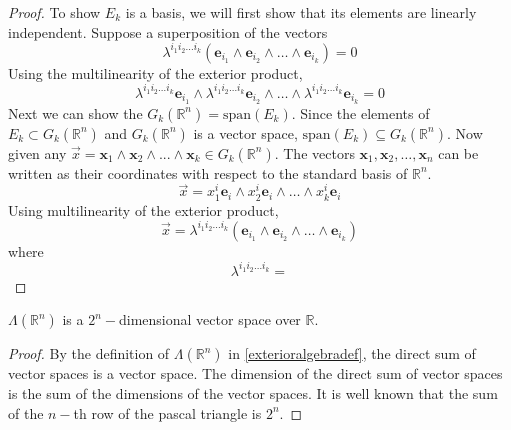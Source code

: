 \documentclass{article}
\numberwithin{equation}{section}
\newcommand{\R}{\mathbb{R}}
\newcommand{\ve}{\mathbf}
\begin{document}
\begin{proposition}
\begin{proof}
        To show $E_k$ is a basis, we will first show that its elements are linearly independent. Suppose a superposition of the vectors
        \begin{equation}
            \lambda^{i_1i_2\dots i_k}(\ve e_{i_1}\wedge\ve e_{i_2}\wedge\dots\wedge\ve e_{i_k})=0
        \end{equation}
        Using the multilinearity of the exterior product, 
        \begin{equation}
            \lambda^{i_1i_2\dots i_k}\ve e_{i_1}\wedge\lambda^{i_1i_2\dots i_k}\ve e_{i_2}\wedge\dots\wedge\lambda^{i_1i_2\dots i_k}\ve e_{i_k}=0
        \end{equation}
        Next we can show the $G_k(\R^n)=\text{span}(E_k)$. Since the elements of $E_k\subset G_k(\R^n)$ and $G_k(\R^n)$ is a vector space, $\text{span}(E_k)\subseteq G_k(\R^n)$. Now given any $\vec x=\ve x_1\wedge\ve x_2\wedge...\wedge\ve x_k\in G_k(\R^n)$. The vectors $\ve x_1,\ve x_2,\dots,\ve x_n$ can be written as their coordinates with respect to the standard basis of $\R^n$.
        \begin{equation}
            \vec x=x_1^i\ve e_i\wedge x_2^i\ve e_i\wedge\dots\wedge x_k^i\ve e_i
        \end{equation}
        Using multilinearity of the exterior product, 
        \begin{equation}
            \vec x=\lambda^{i_1i_2\dots i_k}(\ve e_{i_1}\wedge\ve e_{i_2}\wedge\dots\wedge\ve e_{i_k})
        \end{equation}
        where 
        \begin{equation}
            \lambda^{i_1i_2\dots i_k}= %
        \end{equation}
    \end{proof}
    \begin{corollary}
        $\Lambda(\R^n)$ is a $2^n-$dimensional vector space over $\R$.
        \begin{proof}
            By the definition of $\Lambda(\R^n)$ in \eqref{exterioralgebradef}, the direct sum of vector spaces is a vector space. The dimension of the direct sum of vector spaces is the sum of the dimensions of the vector spaces. It is well known that the sum of the $n-$th row of the pascal triangle is $2^n$.
        \end{proof}
    \end{corollary}
\end{proposition}
\end{document}
